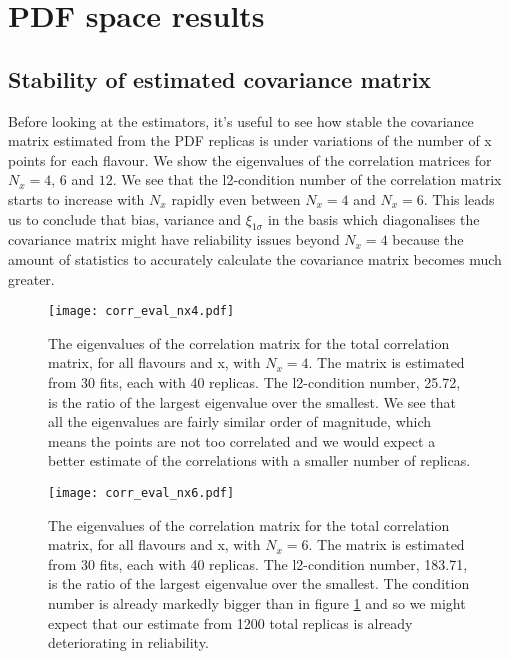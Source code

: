 \section{PDF space results}

\subsection{Stability of estimated covariance matrix}

Before looking at the estimators, it's useful to see how stable the covariance
matrix estimated from the PDF replicas is under variations of the number of x
points for each flavour. We show the eigenvalues of the correlation matrices for
$N_x = 4,\,6$ and $12$. We see that the l2-condition number of the correlation
matrix starts to increase with $N_x$ rapidly even between $N_x=4$ and $N_x=6$.
This leads us to conclude that bias, variance and $\xi_{1\sigma}$ in the basis
which diagonalises the covariance matrix might have reliability issues beyond
$N_x = 4$ because the amount of statistics to accurately calculate the
covariance matrix becomes much greater.

\begin{figure}[]
    \centering
    \texttt{[image: corr\_eval\_nx4.pdf]}
    \caption{The eigenvalues of the correlation matrix for the total correlation
    matrix, for all flavours and x, with $N_x=4$. The matrix is estimated from
    30 fits, each with 40 replicas.
    The l2-condition number, 25.72, is the ratio of the
    largest eigenvalue over the smallest. We see that all the eigenvalues are
    fairly similar order of magnitude, which means the points are not too correlated
    and we would expect a better estimate of the correlations with a smaller
    number of replicas.}
    \label{fig:correignx4}
\end{figure}

\begin{figure}[]
    \centering
    \texttt{[image: corr\_eval\_nx6.pdf]}
    \caption{The eigenvalues of the correlation matrix for the total correlation
    matrix, for all flavours and x, with $N_x=6$. The matrix is estimated from
    30 fits, each with 40 replicas.
    The l2-condition number, 183.71, is the ratio of the
    largest eigenvalue over the smallest. The condition number is already markedly
    bigger than in figure \ref{fig:correignx4} and so we might expect that
    our estimate from 1200 total replicas is already deteriorating in reliability.}
    \label{fig:correignx6}
\end{figure}

